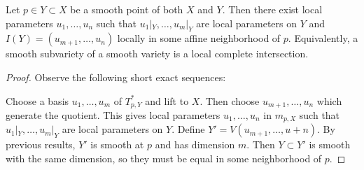 \documentclass[twoside, 10pt]{article}
\begin{document}
    \begin{lem} Let $p \in Y \subset X$ be a
        smooth point of both $X$ and $Y$. Then there exist local parameters
        $u_1, \ldots, u_n$ such that $u_1|_Y, \ldots, u_m|_Y$ are local
        parameters on $Y$ and $I(Y) = (u_{m+1}, \ldots, u_n)$ locally in some
        affine neighborhood of $p$. Equivalently, a smooth subvariety of a
        smooth variety is a local complete intersection.  \begin{proof} Observe
            the following short exact sequences: \begin{center} 
                                                  \end{center} Choose a basis
                                                  $u_1, \ldots, u_m$ of
                                                  $T_{p,Y}^*$ and lift to $X$.
                                                  Then choose $u_{m+1}, \ldots,
                                                  u_n$ which generate the
                                                  quotient.  This gives local
                                                  parameters $u_1, \ldots, u_n$
                                                  in $m_{p,X}$ such that
                                                  $u_1|_Y, \ldots, u_m|_Y$ are
                                                  local parameters on $Y$.
                                                  Define $Y' = V(u_{m+1},
                                                  \ldots, u+n)$. By previous
                                                  results, $Y'$ is smooth at
                                                  $p$ and has dimension $m$.
                                                  Then $Y \subset Y'$ is smooth
                                                  with the same dimension, so
                                                  they must be equal in some
                                                  neighborhood of $p$.
                                              \end{proof} \end{lem}
\end{document}
